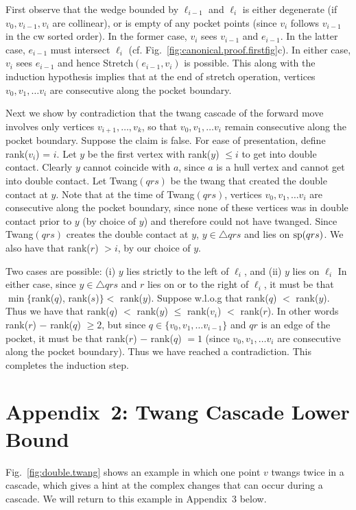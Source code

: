 \pdfoutput=1  \documentclass{article}
\def\sp{\mathop{\rm sp}\nolimits}
\def\st{{\sc Stretch}}
\def\tw{{\sc Twang}}
\newcommand{\figref}[1]{\ref{fig:#1}}
\newcommand{\ABox}{
\raisebox{3pt}{\framebox[6pt]{\rule{6pt}{0pt}}}
}
\newenvironment{pf}{{\bf Proof:}}{\hfill\ABox}
\begin{document}
\begin{pf}
First observe that the wedge bounded by $\ell_{i-1}$ and $\ell_i$ is
either degenerate (if $v_0, v_{i-1}, v_i$ are collinear), or is
empty of any pocket points (since $v_i$ follows $v_{i-1}$ in the cw
sorted order). In the former case, $v_i$ sees $v_{i-1}$ and
$e_{i-1}$. In the latter case, $e_{i-1}$ must intersect $\ell_i$
(cf. Fig.~\figref{canonical.proof.firstfig}c). In either case, $v_i$
sees $e_{i-1}$ and hence \st$(e_{i-1},v_i)$ is possible. This
along with the induction hypothesis implies that at the end of
stretch operation, vertices $v_0, v_1, \ldots v_i$ are consecutive
along the pocket boundary.

Next we show by contradiction that the twang cascade of the forward
move involves only vertices $v_{i+1},\ldots, v_k$, so that
$v_0, v_1, \ldots v_i$ remain consecutive along the pocket boundary.
Suppose the claim is false. For ease of presentation, define
rank($v_i$) = $i$. Let $y$ be the first vertex with rank($y$) $\le
i$ to get into double contact. Clearly $y$ cannot coincide with $a$,
since $a$ is a hull vertex and cannot get into double contact. Let
\tw$(qrs)$ be the twang that created the double contact at $y$. Note
that at the time of \tw$(qrs)$, vertices $v_0, v_1, \ldots v_i$ are
consecutive along the pocket boundary, since none of these vertices
was in double contact prior to $y$ (by choice of $y$) and therefore
could not have twanged. Since \tw$(qrs)$ creates the double contact
at $y$, $y\in \triangle qrs$ and lies on $\sp(qrs)$. We also have
that rank($r$) $> i$, by our choice of $y$.



Two cases are possible: (i) $y$ lies strictly to the left of
$\ell_i$, and (ii) $y$ lies on $\ell_i$ In either case, since
$y\in \triangle qrs$ and $r$ lies on or to the right of $\ell_i$, it
must be that $\min\{$rank($q$), rank($s$)$\} <$ rank($y$). Suppose
w.l.o.g that rank($q$) $<$ rank($y$). Thus we have that rank($q$)
$<$ rank($y$) $\le$ rank($v_i$) $<$ rank($r$). In other words
rank($r$) $-$ rank($q$) $\ge 2$, but since $q \in \{v_0, v_1, \ldots
v_{i-1}\}$ and $qr$ is an edge of the pocket, it must be that
rank($r$) $-$ rank($q$) $=1$ (since $v_0, v_1, \ldots v_i$ are
consecutive along the pocket boundary). Thus we have reached a
contradiction. This completes the induction step.
\end{pf}

\section*{Appendix~2: Twang Cascade Lower Bound}
Fig.~\figref{double.twang} shows an example in which one point $v$
twangs twice in a cascade,
which gives a hint at the complex changes that can occur during
a cascade.
We will return to this example in Appendix~3 below.
\end{document}
